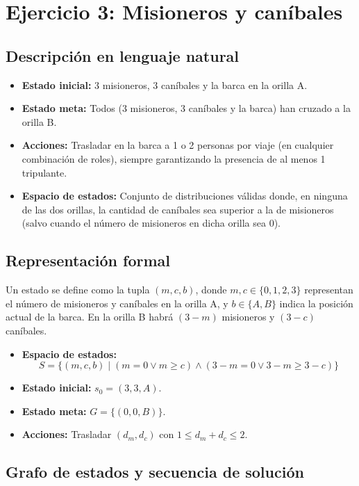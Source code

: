 \documentclass[11pt,letterpaper]{article}
\begin{document}
\section{Ejercicio 3: Misioneros y caníbales}

\subsection{Descripción en lenguaje natural}
\begin{itemize}
  \item \textbf{Estado inicial:} 3 misioneros, 3 caníbales y la barca en la orilla A.
  \item \textbf{Estado meta:} Todos (3 misioneros, 3 caníbales y la barca) han cruzado a la orilla B.
  \item \textbf{Acciones:} Trasladar en la barca a 1 o 2 personas por viaje (en cualquier combinación de roles), siempre garantizando la presencia de al menos 1 tripulante.
  \item \textbf{Espacio de estados:} Conjunto de distribuciones válidas donde, en ninguna de las dos orillas, la cantidad de caníbales sea superior a la de misioneros (salvo cuando el número de misioneros en dicha orilla sea 0).
\end{itemize}

\subsection{Representación formal}
Un estado se define como la tupla $(m, c, b)$, donde $m, c \in \{0,1,2,3\}$ representan el número de misioneros y caníbales en la orilla A, y $b \in \{A, B\}$ indica la posición actual de la barca. En la orilla B habrá $(3-m)$ misioneros y $(3-c)$ caníbales.

\begin{itemize}
  \item \textbf{Espacio de estados:} 
  $$S = \{(m,c,b) \mid (m = 0 \lor m \ge c) \land (3-m = 0 \lor 3-m \ge 3-c)\}$$
  \item \textbf{Estado inicial:} $s_0 = (3,3,A)$.
  \item \textbf{Estado meta:} $G = \{(0,0,B)\}$.
  \item \textbf{Acciones:} Trasladar $(d_m, d_c)$ con $1 \le d_m + d_c \le 2$.
\end{itemize}

\subsection{Grafo de estados y secuencia de solución}
\end{document}
